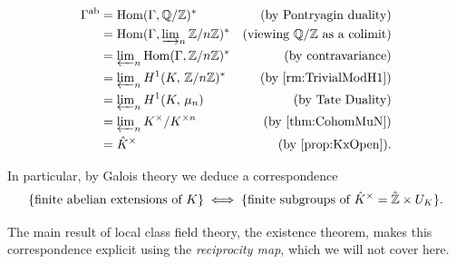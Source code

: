 \documentclass[a4paper, oneside]{memoir}
\begin{document}
\begin{align*}
    \Gamma^{\text{ab}} & = \operatorname{Hom}(\Gamma, \mathbb{Q}/\mathbb{Z})^*                              & \text{(by Pontryagin duality)}    \\
                       & = \operatorname{Hom}(\Gamma, \varinjlim_n\nolimits \mathbb{Z}/n\mathbb{Z})^*          & \text{(viewing $\mathbb{Q}/\mathbb{Z}$ as a colimit)} \\
                       & = \varprojlim_n\nolimits \operatorname{Hom}(\Gamma, \mathbb{Z}/n\mathbb{Z})^*         & \text{(by contravariance)}        \\
                       & = \varprojlim_n\nolimits H^{1}( K, \, \mathbb{Z}/n\mathbb{Z} )^*           & \text{(by \ref{rm:TrivialModH1})} \\
                       & = \varprojlim_n\nolimits H^{1}( K, \, \mu_n )               & \text{(by Tate Duality)}          \\
                       & = \varprojlim_n\nolimits K^{\times} / K^{\times n} & \text{(by \ref{thm:CohomMuN})}    \\
                       & = \hat{K}^{\times}                                  & \text{(by \ref{prop:KxOpen})}.
\end{align*}

In particular, by Galois theory we deduce a correspondence
\[
    \{\text{finite abelian extensions of }K\} \iff \{\text{finite subgroups of }\hat{K}^{\times} = \hat{\mathbb{Z}} \times U_K\}
    .\]

The main result of local class field theory, the existence theorem, makes this correspondence explicit using the \textit{reciprocity map}, which we will not cover here.

\nocite{*}
\printbibliography
\end{document}
